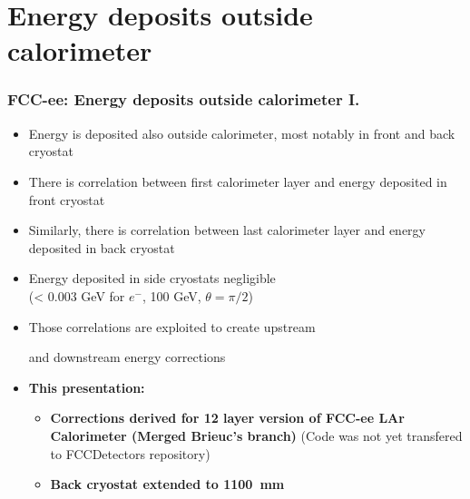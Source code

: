 \documentclass[aspectratio=169]{beamer}
\newcommand{\bluetext}[1]{%
  \textcolor{myBlue}{#1}
}
\newcommand{\redtext}[1]{%
  \textcolor{myRed}{#1}
}
\begin{document}
\section{Energy deposits outside calorimeter}

\begin{frame}
  \frametitle{FCC-ee: Energy deposits outside calorimeter I.}

  \begin{itemize}
    \item Energy is deposited also outside calorimeter, most notably in front
          and back cryostat
    \item There is correlation between first calorimeter layer and energy
          deposited in front cryostat
    \item Similarly, there is correlation between last calorimeter layer and
          energy deposited in back cryostat
    \item Energy deposited in side cryostats negligible \\
          (< 0.003 GeV for $e^{-}$, 100 GeV, $\theta = \pi/2$)
    \item Those correlations are exploited to create \redtext{upstream}
          and \redtext{downstream} energy corrections
    \item \bluetext{\bf This presentation:}
          \begin{itemize}
            \item \bluetext{\bf Corrections derived for 12 layer version of FCC-ee LAr
              Calorimeter (Merged Brieuc's branch)} \redtext{(Code was not yet
              transfered to FCCDetectors repository)}
            \item \bluetext{\bf Back cryostat extended to 1100~mm}
          \end{itemize}
  \end{itemize}
\end{frame}
\end{document}
